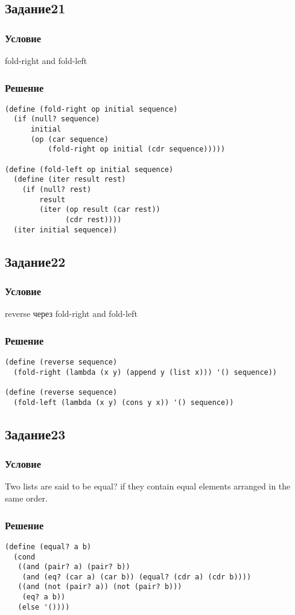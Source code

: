 \documentclass[10pt,a4paper]{article}
\begin{document}
\subsection*{Задание21}
\subsubsection*{Условие}
fold-right and fold-left
\subsubsection*{Решение}
\begin{lstlisting}
(define (fold-right op initial sequence)
  (if (null? sequence)
      initial
      (op (car sequence)
          (fold-right op initial (cdr sequence)))))

(define (fold-left op initial sequence)
  (define (iter result rest)
    (if (null? rest)
        result
        (iter (op result (car rest))
              (cdr rest))))
  (iter initial sequence))
\end{lstlisting}

\subsection*{Задание22}
\subsubsection*{Условие}
reverse через fold-right and fold-left 
\subsubsection*{Решение}
\begin{lstlisting}
(define (reverse sequence)
  (fold-right (lambda (x y) (append y (list x))) '() sequence))

(define (reverse sequence)
  (fold-left (lambda (x y) (cons y x)) '() sequence))
\end{lstlisting}

\subsection*{Задание23}
\subsubsection*{Условие}
Two lists are said to be equal? if they contain equal elements arranged in the same order.
\subsubsection*{Решение}
\begin{lstlisting}
(define (equal? a b)
  (cond
   ((and (pair? a) (pair? b))
    (and (eq? (car a) (car b)) (equal? (cdr a) (cdr b))))
   ((and (not (pair? a)) (not (pair? b)))
    (eq? a b))
   (else '())))
\end{lstlisting}
\end{document}
